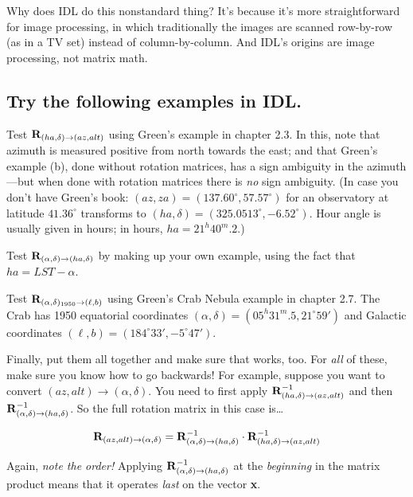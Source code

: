 	Why does IDL do this nonstandard thing? It's because it's more
straightforward for image processing, in which traditionally the images
are scanned row-by-row (as in a TV set) instead of column-by-column. And
IDL's origins are image processing, not matrix math.

\subsection {Try the following examples in IDL.}

	Test ${\bf R}_{(ha, \delta) \rightarrow (az, alt)}$ using
Green's example in chapter 2.3.  In this, note that azimuth is measured
positive from north towards the east; and that Green's example (b), done
without rotation matrices, has a sign ambiguity in the azimuth---but
when done with rotation matrices there is {\it no} sign ambiguity. 
(In case you don't have Green's book: $(az,za)=(137.60^\circ,57.57^\circ)$
for an observatory at latitude $41.36^\circ$ transforms to
$(ha,\delta)=(325.0513^\circ, -6.52^\circ)$. Hour angle is usually
given in hours; in hours, $ha=21^h40^m.2$.)

	Test ${\bf R}_{(\alpha, \delta) \rightarrow (ha, \delta)}$ by
making up your own example, using the fact that $ha = LST - \alpha$. 

	Test ${\bf R}_{(\alpha, \delta)_{1950} \rightarrow (\ell, b)}$
using Green's Crab Nebula example in chapter 2.7.  The Crab has 1950 
equatorial coordinates $(\alpha, \delta)=(05^h31^m.5, 21^\circ59')$ and
Galactic coordinates $(\ell,b)=(184^\circ33', -5^\circ47')$.

	Finally, put them all together and make sure that works, too. 
For {\it all} of these, make sure you know how to go backwards! For
example, suppose you want to convert $(az, alt) \rightarrow (\alpha,
\delta)$.  You need to first apply ${\bf R}_{(ha, \delta) \rightarrow
(az, alt)}^{-1}$ and then ${\bf R}_{(\alpha, \delta) \rightarrow (ha,
\delta)}^{-1}$.  So the full rotation matrix in this case is\dots

\begin{equation}
{\bf R}_{(az, alt) \rightarrow (\alpha, \delta)} = 
{\bf R}_{(\alpha, \delta) \rightarrow (ha, \delta)}^{-1} \cdot
{\bf R}_{(ha, \delta) \rightarrow (az, alt)}^{-1}
\end{equation}


\noindent Again, {\it note the order!} Applying ${\bf R}_{(\alpha,
\delta) \rightarrow (ha, \delta)}^{-1}$ at the {\it beginning} in the
matrix product means that it operates {\it last} on the vector {\bf x}. 



